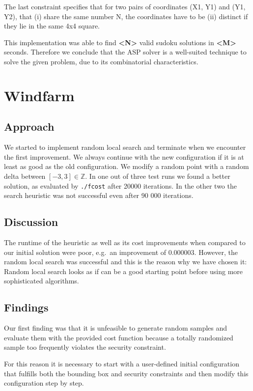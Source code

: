 \documentclass{article}
\begin{document}
The last constraint specifies that for two pairs of coordinates (X1, Y1) and (Y1, Y2), that (i) share the same number N, the coordinates have to be (ii) distinct if they lie in the same 4x4 square.

This implementation was able to find \textbf{\textless N\textgreater} valid sudoku solutions in \textbf{\textless M\textgreater} seconds. Therefore we conclude that the ASP solver is a well-suited technique to solve the given problem, due to its combinatorial characteristics.



\section{Windfarm}



\subsection{Approach}
We started to implement random local search and terminate when we encounter the first improvement.
We always continue with the new configuration if it is at least as good as the old configuration.
We modify a random point with a random delta between $[-3,3] \in \mathbb{Z}$.
In one out of three test runs we found a better solution, as evaluated by \texttt{./fcost} after 20000 iterations. In the other two the search heuristic was not successful even after 90 000 iterations.

\subsection{Discussion}
The runtime of the heuristic as well as its cost improvements when compared to our initial solution were poor, e.g.\ an improvement of 0.000003.
However, the random local search was successful and this is the reason why we have chosen it:
Random local search looks as if can be a good starting point before using more sophisticated algorithms.

\subsection{Findings}
Our first finding was that it is unfeasible to generate random samples and evaluate them with the provided cost function because a totally randomized sample too frequently violates the security constraint.

For this reason it is necessary to start with a user-defined initial configuration that fulfills both the bounding box and security constraints and then modify this configuration step by step.


\end{document}
